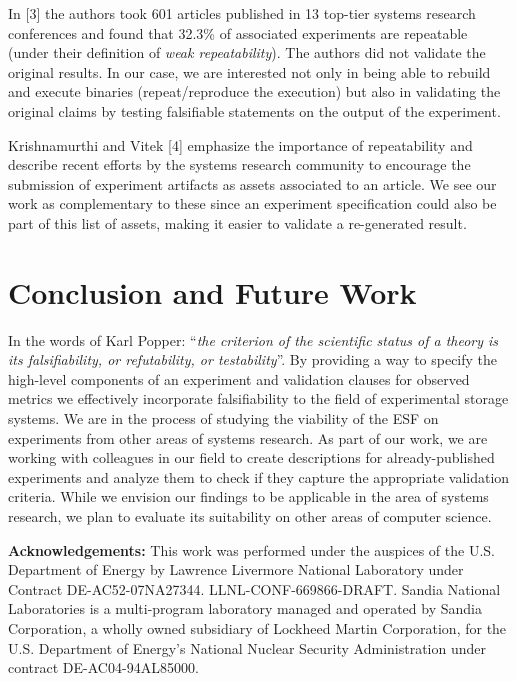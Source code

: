 \documentclass[10pt,reprint]{sigplanconf}
\begin{document}
In {[}3{]} the authors took 601 articles published in 13 top-tier
systems research conferences and found that 32.3\% of associated
experiments are repeatable (under their definition of \emph{weak
repeatability}). The authors did not validate the original results. In
our case, we are interested not only in being able to rebuild and
execute binaries (repeat/reproduce the execution) but also in validating
the original claims by testing falsifiable statements on the output of
the experiment.

Krishnamurthi and Vitek {[}4{]} emphasize the importance of
repeatability and describe recent efforts by the systems research
community to encourage the submission of experiment artifacts as assets
associated to an article. We see our work as complementary to these
since an experiment specification could also be part of this list of
assets, making it easier to validate a re-generated result.

\section{Conclusion and Future Work}\label{conclusion-and-future-work}

In the words of Karl Popper: ``\emph{the criterion of the scientific
status of a theory is its falsifiability, or refutability, or
testability}''. By providing a way to specify the high-level components
of an experiment and validation clauses for observed metrics we
effectively incorporate falsifiability to the field of experimental
storage systems. We are in the process of studying the viability of the
ESF on experiments from other areas of systems research. As part of our
work, we are working with colleagues in our field to create descriptions
for already-published experiments and analyze them to check if they
capture the appropriate validation criteria. While we envision our
findings to be applicable in the area of systems research, we plan to
evaluate its suitability on other areas of computer science.

\textbf{Acknowledgements:} This work was performed under the auspices of
the U.S. Department of Energy by Lawrence Livermore National Laboratory
under Contract DE-AC52-07NA27344. LLNL-CONF-669866-DRAFT. Sandia
National Laboratories is a multi-program laboratory managed and operated
by Sandia Corporation, a wholly owned subsidiary of Lockheed Martin
Corporation, for the U.S. Department of Energy's National Nuclear
Security Administration under contract DE-AC04-94AL85000.
\end{document}
